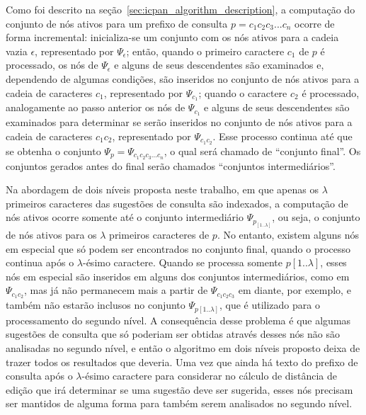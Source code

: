 Como foi descrito na seção~\ref{sec:icpan_algorithm_description}, a computação do conjunto de nós ativos para um prefixo de consulta $p = c_{1}c_{2}c_{3}...c_{n}$ ocorre de forma incremental: inicializa-se um conjunto com os nós ativos para a cadeia vazia $\epsilon$, representado por $\Psi_{\epsilon}$; então, quando o primeiro caractere $c_{1}$ de $p$ é processado, os nós de $\Psi_{\epsilon}$ e alguns de seus descendentes são examinados e, dependendo de algumas condições, são inseridos no conjunto de nós ativos para a cadeia de caracteres $c_{1}$, representado por $\Psi_{c_{1}}$; quando o caractere $c_{2}$ é processado, analogamente ao passo anterior os nós de $\Psi_{c_{1}}$ e alguns de seus descendentes são examinados para determinar se serão inseridos no conjunto de nós ativos para a cadeia de caracteres $c_{1}c_{2}$, representado por $\Psi_{c_{1}c_{2}}$. Esse processo continua até que se obtenha o conjunto $\Psi_{p} = \Psi_{c_{1}c_{2}c_{3}...c_{n}}$, o qual será chamado de ``conjunto final''. Os conjuntos gerados antes do final serão chamados ``conjuntos intermediários''.

Na abordagem de dois níveis proposta neste trabalho, em que apenas os $\lambda$ primeiros caracteres das sugestões de consulta são indexados, a computação de nós ativos ocorre somente até o conjunto intermediário $\Psi_{p_[1..\lambda]}$, ou seja, o conjunto de nós ativos para os $\lambda$ primeiros caracteres de $p$. No entanto, existem alguns nós em especial que só podem ser encontrados no conjunto final, quando o processo continua após o $\lambda$-ésimo caractere. Quando se processa somente $p[1..\lambda]$, esses nós em especial são inseridos em alguns dos conjuntos intermediários, como em $\Psi_{c_1c_2}$, mas já não permanecem mais a partir de $\Psi_{c_1c_2c_3}$ em diante, por exemplo, e também não estarão inclusos no conjunto $\Psi_{p[1..\lambda]}$, que é utilizado para o processamento do segundo nível. A consequência desse problema é que algumas sugestões de consulta que só poderiam ser obtidas através desses nós não são analisadas no segundo nível, e então o algoritmo em dois níveis proposto deixa de trazer todos os resultados que deveria. Uma vez que ainda há texto do prefixo de consulta após o $\lambda$-ésimo caractere para considerar no cálculo de distância de edição que irá determinar se uma sugestão deve ser sugerida, esses nós precisam ser mantidos de alguma forma para também serem analisados no segundo nível.

